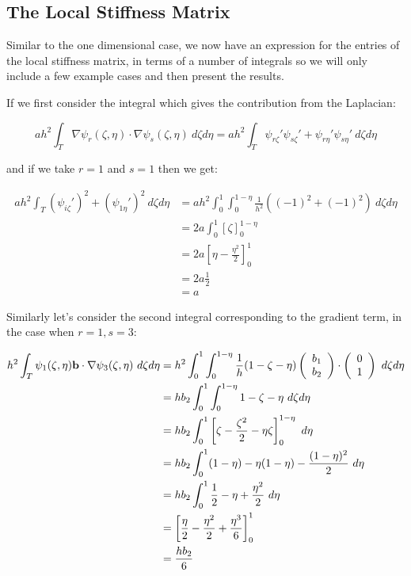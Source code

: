 \subsection{The Local Stiffness Matrix}

Similar to the one dimensional case, we now have an expression for the entries
of the local stiffness matrix, in terms of a number of integrals
 so we will only include a few
example cases and then present the results.

If we first consider the integral which gives the contribution from the
Laplacian:

\begin{equation*}
    ah^2\int_T\nabla\psi_r(\zeta,\eta)\cdot\nabla\psi_s(\zeta,\eta)\ d\zeta d\eta =
    ah^2\int_T\psi_{r\zeta}'\psi_{s\zeta}' + \psi_{r\eta}'\psi_{s\eta}'\ d\zeta d\eta
\end{equation*}

and if we take $r = 1$ and $s = 1$ then we get:

\begin{align*}
    ah^2\int_T(\psi_{i\zeta}')^2 + (\psi_{1\eta}')^2\ d\zeta d\eta
    &= ah^2\int_0^1\int_0^{1 - \eta}\frac{1}{h^2}((-1)^2 + (-1)^2)\ d\zeta d\eta \\
    &= 2a\int_0^1\left[\zeta\right]_0^{1 - \eta} \\
    &= 2a\left[\eta - \frac{\eta^2}{2}\right]_0^1 \\
    &= 2a\frac{1}{2} \\
    &= a
\end{align*}

Similarly let's consider the second integral corresponding to the gradient term,
in the case when $r = 1, s = 3$:

\begin{align*}
    h^2\int_T\psi_1(\zeta,\eta)\v{b} \cdot \nabla\psi_3(\zeta,\eta)\ d\zeta d\eta
     &= h^2\int_0^1\int_0^{1-\eta}\frac{1}{h}(1 - \zeta - \eta)
           \left(\begin{array}{c} b_1 \\b_2 \end{array}\right) \cdot
           \left(\begin{array}{c} 0 \\ 1 \end{array}\right)\ d\zeta d\eta \\
     &= hb_2\int_0^1\int_0^{1-\eta} 1 - \zeta - \eta \ d\zeta d\eta \\
     &= hb_2\int_0^1\left[\zeta - \frac{\zeta^2}{2} - \eta\zeta \right]_0^{1-\eta}\ d\eta \\
     &= hb_2\int_0^1(1 -\eta) - \eta(1-\eta) - \frac{(1 - \eta)^2}{2}\ d\eta \\
     &= hb_2\int_0^1\frac{1}{2} -\eta +\frac{\eta^2}{2}\ d\eta \\
     &= \left[\frac{\eta}{2} - \frac{\eta^2}{2} + \frac{\eta^3}{6}\right]_0^1 \\
     &= \frac{hb_2}{6}
\end{align*}

